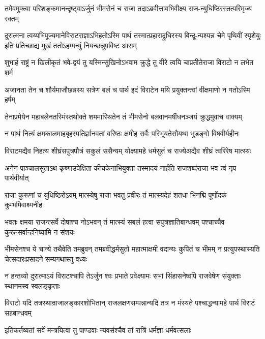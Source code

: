 \twolineshloka
{तमेवमुक्त्वा परिशङ्कमानन्दृष्ट्वाऽर्जुनं भीमसेनं च राजा}
{तदाऽब्रवीत्तावभिवीक्ष्य राज-न्युधिष्ठिरस्तत्परिमृज्य रक्तम्}


\threelineshloka
{दुरात्मना त्वय्यभिपूज्यमानेविराटराज्ञाऽभिहतोऽस्मि पार्थ}
{तस्मात्प्रहाराद्रुधिरस्य बिन्दू-न्पश्यन्न चेमे पृथिवीं स्पृशेयुः}
{इति प्रतिच्छाद्य मुखं ततोऽहम्मन्युं नियच्छन्नुपविष्ट आसम्}


\twolineshloka
{शुभार्ह राष्ट्रं न खिलीकृतं भवे-द्वयं तु यस्मिन्सुखिनोऽभवाम}
{क्रुद्धे तु वीरे त्वयि चाप्रतीतेराजा विराटो न लभेत शर्म}


\twolineshloka
{अजानता तेन च शौर्यमाजौछन्नस्य सत्रेण बलं च पार्थ}
{इदं विराटेन मयि प्रयुक्तन्त्वां वीक्षमाणो न गतोऽस्मि हर्षम्}


\twolineshloka
{तेनाप्रमेयेन महाबलेनतस्मिंस्तथोक्ते शममास्थितेन}
{तं भीमसेनो बलवानमर्षीधनञ्जयं क्रुद्धमुवाच वाक्यम्}


\twolineshloka
{न पार्थ नित्यं क्षमकालमाहबृहस्पतिर्ज्ञानवतां वरिष्ठः}
{क्षमीह सर्वैः परिभूयतेसौयथा भुडङ्गो विषवीर्यहीनः}


\twolineshloka
{विराटमद्यैव निहत्य शीघ्रंसपुत्रपौत्रं सकुलं ससैन्यम्}
{योक्ष्यामहे धर्मसुतं च राज्येअद्यैव शीघ्रं त्वरिरेष मात्स्यः}


\twolineshloka
{अनेन पाञ्चालसुताऽथ कृष्णाउपेक्षिता कीचकेनाभियुक्ता}
{तस्मादयं नार्हति राजशब्दंराजा भव त्वं नृप पार्थवीर्यात्}


\fourlineindentedshloka
{राजा कुरूणां च युधिष्ठिरोऽयम्}
{मात्स्येषु राजा भवतु प्रवीरः}
{तं मात्स्यदेहं शतधा भिनद्मि}
{पूर्णोदकं कुम्भमिवाश्मनीह}




\threelineshloka
{भवतः क्षमया राजन्त्सर्वे दोषाश्च नोऽभवन्}
{तं मात्स्यं सबलं हत्वा सपुत्रज्ञातिबान्धवम्}
{पश्चाच्चैव कुरून्सर्वान्हनिष्यामि न संशयः}


\onelineshloka
{भीमसेनश्च ये चान्ये तथैवेति तमब्रुवन्}
\twolineshloka
{तमब्रवीद्धर्मसुतो महात्माक्षमी वदान्यः कुपितं च भीमम्}
{न प्रत्युपस्थास्यति चेत्सदारःप्रसादने सम्यगथास्तु वध्यः}


\onelineshloka
{न हन्तव्यो दुरात्माऽयं विराटश्चापि तेऽर्जुन}
\twolineshloka
{श्वः प्रभाते प्रवेक्ष्यामः सभां सिंहासनेष्वपि}
{राजवेषेण संयुक्ताः स्थानमस्व स्वलङ्कृताः}


\threelineshloka
{विराटो यदि तत्रस्थान्राजालङ्कारशोभितान्}
{राजलक्षणसम्पन्नान्यदि तत्र न मंस्यते}
{पश्चाद्धन्यामहे पार्थ विराटं सहबान्धवम्}


\twolineshloka
{इतिकर्तव्यतां सर्वे मन्त्रयित्वा तु पाण्डवाः}
{न्यवसंश्चैव तां रात्रिं धर्मज्ञा धर्मवत्सलाः}


